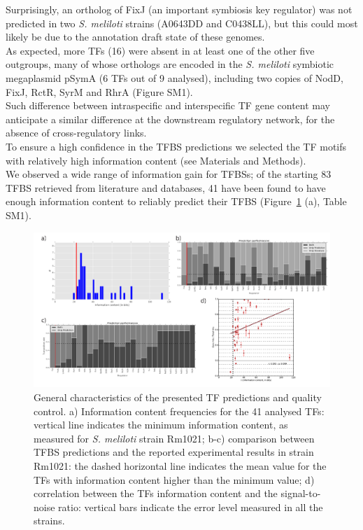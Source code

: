  Surprisingly, an ortholog of FixJ (an important symbiosis key regulator) was not predicted in two \textit{S. meliloti} strains (A0643DD and C0438LL), but this could most likely be due to the annotation draft state of these genomes.\\
As expected, more TFs (16) were absent in at least one of the other five outgroups, many of whose orthologs are encoded in the \textit{S. meliloti} symbiotic megaplasmid pSymA (6 TFs out of 9 analysed), including two copies of NodD, FixJ, RctR, SyrM and RhrA (Figure SM1).\\
 Such difference between intraspecific and interspecific TF gene content may anticipate a similar difference at the downstream regulatory network, for the absence of cross-regulatory links.\\
To ensure a high confidence in the TFBS predictions we selected the TF motifs with relatively high information content (see Materials and Methods).\\
We observed a wide range of information gain for TFBSs; of the starting 83 TFBS retrieved from literature and databases, 41 have been found to have enough information content to reliably predict their TFBS (Figure~\ref{fig:reg1} (a), Table SM1).\\
\begin{figure}[!tb]
	\centering
	\includegraphics[width=1\textwidth]{./figures/Appendix_1/1_reg}
  	\caption{\label{fig:reg1} General characteristics of the presented TF predictions and quality control. a) Information content frequencies for the 41 analysed TFs: vertical line indicates the minimum information content, as measured for \textit{S. meliloti} strain Rm1021; b-c) comparison between TFBS predictions and the reported experimental results in strain Rm1021: the dashed horizontal line indicates the mean value for the TFs with information content higher than the minimum value; d) correlation between the TFs information content and the signal-to-noise ratio: vertical bars indicate the error level measured in all the strains.}
\end{figure}

